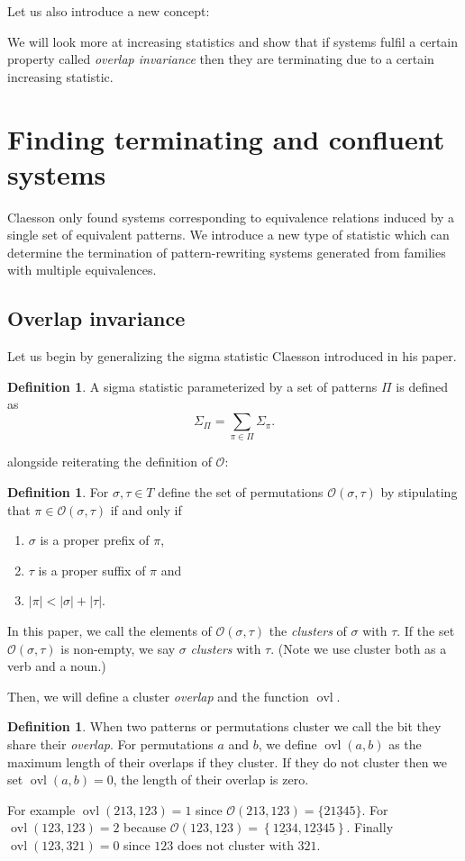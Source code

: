 \documentclass[a4paper, 11pt, english]{article}
\theoremstyle{definition}
\newtheorem{definition}[theorem]{Definition}
\newcommand{\Ocal}{\mathcal{O}}
\DeclareMathOperator{\ovl}{ovl}
\begin{document}
Let us also introduce a new concept:

We will look more at increasing statistics and show that if systems fulfil a certain property called
\emph{overlap invariance} then they are terminating due to a certain increasing statistic.

\section{Finding terminating and confluent systems}
Claesson only found systems corresponding to equivalence relations induced by a
single set of equivalent patterns. We introduce a new type of statistic which can determine the
termination of pattern-rewriting systems generated from families with multiple equivalences.

\subsection{Overlap invariance}
Let us begin by generalizing the sigma statistic Claesson introduced in his paper.
\begin{definition}
    A sigma statistic parameterized by a set of patterns $\Pi$ is defined as
    \[
        \Sigma_\Pi = \sum_{\pi \in \Pi} \Sigma_{\pi}.
    \]
\end{definition}
alongside reiterating the definition of $\Ocal$:
\begin{definition}
    For $\sigma, \tau \in T$ define the set of permutations $\Ocal(\sigma,
    \tau)$ by stipulating that $\pi \in \Ocal(\sigma, \tau)$ if and only if
    \begin{enumerate}
    \item $\sigma$ is a proper prefix of $\pi$,
    \item $\tau$ is a proper suffix of $\pi$ and
    \item $|\pi| < |\sigma| + |\tau|$.
    \end{enumerate}
    In this paper, we call the elements of $\Ocal(\sigma, \tau)$ the \emph{clusters} of $\sigma$ with $\tau$.
    If the set $\Ocal(\sigma, \tau)$ is non-empty, we say $\sigma$ \emph{clusters} with $\tau$.
    (Note we use cluster both as a verb and a noun.)
\end{definition}

Then, we will define a cluster \emph{overlap} and the function $\ovl$.
\begin{definition}
  When two patterns or permutations cluster we call the bit they share their \emph{overlap}.
  For permutations $a$ and $b$, we define $\ovl(a,b)$ as the maximum length of their overlaps if they 
  cluster. If they do not cluster then we set $\ovl(a,b)=0$, the length of their overlap is zero.

  For example $\ovl(213, 123) = 1$ since $\Ocal(213, 123) = \{ 21\underline{3}45 \}$. For $\ovl(123, 123) = 2$
  because $\Ocal(123, 123) = \left\{ 1\underline{23}4, 12\underline{3}45 \right\}$. Finally
  $\ovl(123, 321)=0$ since $123$ does not cluster with $321$.
\end{definition}
\end{document}
